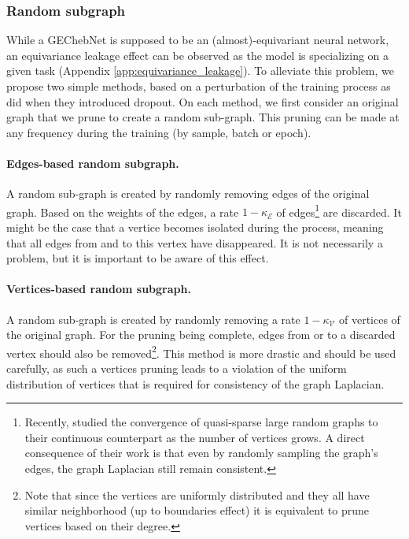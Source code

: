 \documentclass{article}
\begin{document}
\subsubsection{Random subgraph}

While a GEChebNet is supposed to be an (almost)-equivariant neural network, an equivariance leakage effect can be observed as the model is specializing on a given task (Appendix \ref{app:equivariance_leakage}). To alleviate this problem, we propose two simple methods, based on a perturbation of the training process as \cite{srivastava2014dropout} did when they introduced dropout. On each method, we first consider an original graph that we prune to create a random sub-graph. This pruning can be made at any frequency during the training (by sample, batch or epoch).

\paragraph{Edges-based random subgraph.} 
A random sub-graph is created by randomly removing edges of the original graph. Based on the weights of the edges, a rate $1 - \kappa_\mathcal{E}$ of edges\footnote{Recently, \cite{keriven2020convergence} studied the convergence of quasi-sparse large random graphs to their continuous counterpart as the number of vertices grows. A direct consequence of their work is that even by randomly sampling the graph's edges, the graph Laplacian still remain consistent.} are discarded. It might be the case that a vertice becomes isolated during the process, meaning that all edges from and to this vertex have disappeared. It is not necessarily a problem, but it is important to be aware of this effect. 
\paragraph{Vertices-based random subgraph.}  
A random sub-graph is created by randomly removing a rate $1-\kappa_\mathcal{V}$ of vertices of the original graph. For the pruning being complete, edges from or to a discarded vertex should also be removed\footnote{Note that since the vertices are uniformly distributed and they all have similar neighborhood (up to boundaries effect) it is equivalent to prune vertices based on their degree.}. This method is more drastic and should be used carefully, as such a vertices pruning leads to a violation of the uniform distribution of vertices that is required for consistency of the graph Laplacian. 
\end{document}
